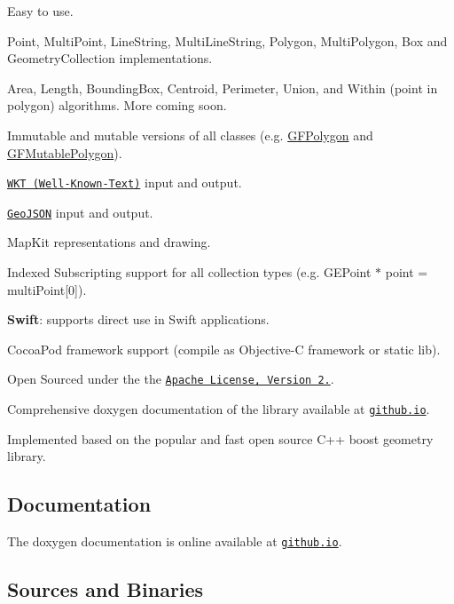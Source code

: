 \begin{DoxyItemize}
\item Easy to use.
\item Point, Multi\+Point, Line\+String, Multi\+Line\+String, Polygon, Multi\+Polygon, Box and Geometry\+Collection implementations.
\item Area, Length, Bounding\+Box, Centroid, Perimeter, Union, and Within (point in polygon) algorithms. More coming soon.
\item Immutable and mutable versions of all classes (e.\+g. {\ttfamily \hyperlink{interface_g_f_polygon}{G\+F\+Polygon}} and {\ttfamily \hyperlink{interface_g_f_mutable_polygon}{G\+F\+Mutable\+Polygon}}).
\item \href{https://en.wikipedia.org/wiki/Well-known_text}{\tt W\+K\+T (Well-\/\+Known-\/\+Text)} input and output.
\item \href{http://geojson.org/}{\tt Geo\+J\+S\+O\+N} input and output.
\item Map\+Kit representations and drawing.
\item Indexed Subscripting support for all collection types (e.\+g. {\ttfamily G\+E\+Point $\ast$ point = multi\+Point\mbox{[}0\mbox{]}}).
\item {\bfseries Swift}\+: supports direct use in Swift applications.
\item Cocoa\+Pod framework support (compile as Objective-\/\+C framework or static lib).
\item Open Sourced under the the \href{http://www.apache.org/licenses/LICENSE-2.0.html}{\tt Apache License, Version 2.}.
\item Comprehensive doxygen documentation of the library available at \href{http://tonystone.github.io/geofeatures}{\tt github.\+io}.
\item Implemented based on the popular and fast open source C++ boost geometry library.
\end{DoxyItemize}

\subsection*{Documentation}

The doxygen documentation is online available at \href{http://tonystone.github.io/geofeatures}{\tt github.\+io}.

\subsection*{Sources and Binaries}

